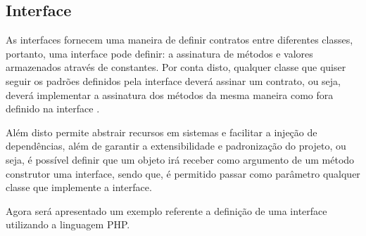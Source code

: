 \subsection{Interface}

As interfaces fornecem uma maneira de definir contratos entre diferentes
classes, portanto, uma interface pode definir: a assinatura de métodos e
valores armazenados através de constantes. Por conta disto, qualquer classe  que
quiser seguir os padrões definidos pela interface deverá assinar um contrato,
ou seja, deverá implementar a assinatura dos métodos da mesma maneira como  fora
definido na interface \cite{programmingPhp}.

Além disto permite abstrair recursos em sistemas e facilitar a
injeção de dependências, além de garantir a extensibilidade e padronização do
projeto, ou seja, é possível definir que um objeto irá receber como argumento de
um método construtor uma interface, sendo que, é permitido passar como parâmetro
qualquer classe que implemente a interface.

Agora será apresentado um exemplo referente a definição de uma interface
utilizando a linguagem PHP.